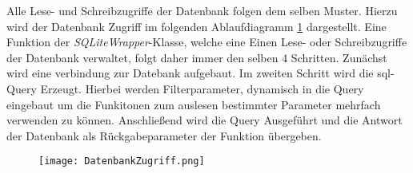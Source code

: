 Alle Lese- und Schreibzugriffe der Datenbank folgen dem selben Muster. Hierzu wird der Datenbank Zugriff im folgenden Ablaufdiagramm \ref{fig:Datenbankzugriff} dargestellt. Eine Funktion der \textit{SQLiteWrapper}-Klasse, welche eine Einen Lese- oder Schreibzugriffe der Datenbank verwaltet, folgt daher immer den selben 4 Schritten. Zunächst wird eine verbindung zur Datebank aufgebaut. Im zweiten Schritt wird die \ac{sql}-Query Erzeugt. Hierbei werden Filterparameter, dynamisch in die Query eingebaut um die Funkitonen zum auslesen bestimmter Parameter mehrfach verwenden zu können. Anschließend wird die Query Ausgeführt und die Antwort der Datenbank als Rückgabeparameter der Funktion übergeben.   
\begin{center}
  \begin{figure}[h!]
      \centering
      \texttt{[image: DatenbankZugriff.png]}
      \caption{}
      \label{fig:Datenbankzugriff}
  \end{figure}
\end{center}